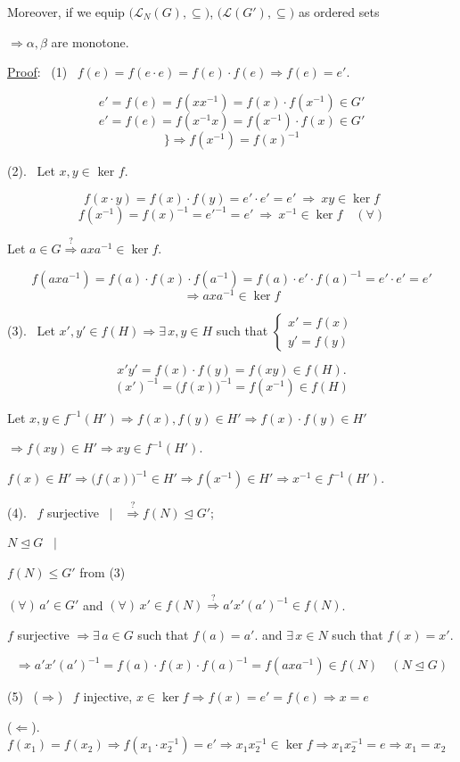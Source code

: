 \documentclass[12pt]{article}
\begin{document}
\noindent Moreover, if we equip $\big(\mathcal{L}_N(G),\subseteq\big)$, $\big(\mathcal{L}(G'),\subseteq\big)$ as ordered sets

\noindent $\Rightarrow \alpha,\beta$ are monotone.

\bigskip
\noindent\underline{Proof}: \ (1) \ $f(e) = f(e\cdot e) = f(e)\cdot f(e) \Rightarrow f(e)=e'$.

\[
e' = f(e) = f(xx^{-1}) = f(x)\cdot f(x^{-1}) \in G'
\]
\[
e' = f(e) = f(x^{-1}x) = f(x^{-1})\cdot f(x) \in G'
\]
\[
\Big\} \Rightarrow f(x^{-1}) = f(x)^{-1}
\]

\bigskip
\noindent (2). \ Let $x,y\in$ ker $f$.

\[
f(x\cdot y) = f(x)\cdot f(y) = e'\cdot e' = e' \ \Rightarrow \ xy\in\ker f
\]
\[
f(x^{-1}) = f(x)^{-1} = e'^{-1} = e' \ \Rightarrow \ x^{-1}\in\ker f \quad (\forall)
\]

\bigskip
\noindent Let $a\in G \overset{?}{\Rightarrow} axa^{-1}\in\ker f$.

\[
f(axa^{-1}) = f(a)\cdot f(x)\cdot f(a^{-1}) = f(a)\cdot e'\cdot f(a)^{-1} = e'\cdot e' = e'
\]
\[
\Rightarrow axa^{-1}\in\ker f
\]

\bigskip
\noindent (3). \ Let $x',y'\in f(H) \Rightarrow \exists\,x,y\in H$ such that $\begin{cases}x'=f(x)\\y'=f(y)\end{cases}$

\[
x'y' = f(x)\cdot f(y) = f(xy) \in f(H).
\]
\[
(x')^{-1} = \big(f(x)\big)^{-1} = f(x^{-1}) \in f(H)
\]

\bigskip
\noindent Let $x,y\in f^{-1}(H') \Rightarrow f(x),f(y)\in H' \Rightarrow f(x)\cdot f(y)\in H'$

\noindent $\Rightarrow f(xy)\in H' \Rightarrow xy\in f^{-1}(H')$.

\noindent $f(x)\in H' \Rightarrow \big(f(x)\big)^{-1}\in H' \Rightarrow f(x^{-1})\in H' \Rightarrow x^{-1}\in f^{-1}(H')$.

\bigskip
\noindent (4). \ $f$ surjective \ $\Big|$ \ $\overset{?}{\Rightarrow} f(N)\trianglelefteq G'$;

\noindent $N\trianglelefteq G$ \ $\Big|$

\noindent $f(N)\leq G'$ from (3)

\bigskip
\noindent $(\forall)\,a'\in G'$ and $(\forall)\,x'\in f(N) \overset{?}{\Rightarrow} a'x'(a')^{-1}\in f(N)$.

\noindent $f$ surjective $\Rightarrow \exists\,a\in G$ such that $f(a)=a'$. \quad and $\exists\,x\in N$ such that $f(x)=x'$.

\[
\Rightarrow a'x'(a')^{-1} = f(a)\cdot f(x)\cdot f(a)^{-1} = f(axa^{-1}) \in f(N) \quad (N\trianglelefteq G)
\]

\bigskip
\noindent (5) \ ($\Rightarrow$) \ $f$ injective, $x\in\ker f \Rightarrow f(x)=e'=f(e) \Rightarrow x=e$

\noindent ($\Leftarrow$). \ $f(x_1)=f(x_2) \Rightarrow f(x_1\cdot x_2^{-1})=e' \Rightarrow x_1x_2^{-1}\in\ker f \Rightarrow x_1x_2^{-1}=e \Rightarrow x_1=x_2$
\end{document}
